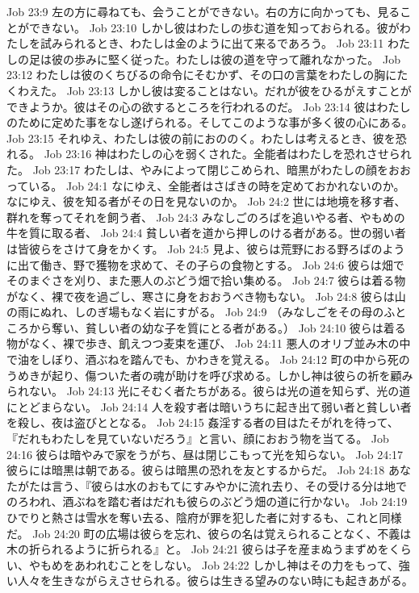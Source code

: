 Job 23:9  左の方に尋ねても、会うことができない。右の方に向かっても、見ることができない。
Job 23:10  しかし彼はわたしの歩む道を知っておられる。彼がわたしを試みられるとき、わたしは金のように出て来るであろう。
Job 23:11  わたしの足は彼の歩みに堅く従った。わたしは彼の道を守って離れなかった。
Job 23:12  わたしは彼のくちびるの命令にそむかず、その口の言葉をわたしの胸にたくわえた。
Job 23:13  しかし彼は変ることはない。だれが彼をひるがえすことができようか。彼はその心の欲するところを行われるのだ。
Job 23:14  彼はわたしのために定めた事をなし遂げられる。そしてこのような事が多く彼の心にある。
Job 23:15  それゆえ、わたしは彼の前におののく。わたしは考えるとき、彼を恐れる。
Job 23:16  神はわたしの心を弱くされた。全能者はわたしを恐れさせられた。
Job 23:17  わたしは、やみによって閉じこめられ、暗黒がわたしの顔をおおっている。
Job 24:1  なにゆえ、全能者はさばきの時を定めておかれないのか。なにゆえ、彼を知る者がその日を見ないのか。
Job 24:2  世には地境を移す者、群れを奪ってそれを飼う者、
Job 24:3  みなしごのろばを追いやる者、やもめの牛を質に取る者、
Job 24:4  貧しい者を道から押しのける者がある。世の弱い者は皆彼らをさけて身をかくす。
Job 24:5  見よ、彼らは荒野におる野ろばのように出て働き、野で獲物を求めて、その子らの食物とする。
Job 24:6  彼らは畑でそのまぐさを刈り、また悪人のぶどう畑で拾い集める。
Job 24:7  彼らは着る物がなく、裸で夜を過ごし、寒さに身をおおうべき物もない。
Job 24:8  彼らは山の雨にぬれ、しのぎ場もなく岩にすがる。
Job 24:9  （みなしごをその母のふところから奪い、貧しい者の幼な子を質にとる者がある。）
Job 24:10  彼らは着る物がなく、裸で歩き、飢えつつ麦束を運び、
Job 24:11  悪人のオリブ並み木の中で油をしぼり、酒ぶねを踏んでも、かわきを覚える。
Job 24:12  町の中から死のうめきが起り、傷ついた者の魂が助けを呼び求める。しかし神は彼らの祈を顧みられない。
Job 24:13  光にそむく者たちがある。彼らは光の道を知らず、光の道にとどまらない。
Job 24:14  人を殺す者は暗いうちに起き出て弱い者と貧しい者を殺し、夜は盗びととなる。
Job 24:15  姦淫する者の目はたそがれを待って、『だれもわたしを見ていないだろう』と言い、顔におおう物を当てる。
Job 24:16  彼らは暗やみで家をうがち、昼は閉じこもって光を知らない。
Job 24:17  彼らには暗黒は朝である。彼らは暗黒の恐れを友とするからだ。
Job 24:18  あなたがたは言う、『彼らは水のおもてにすみやかに流れ去り、その受ける分は地でのろわれ、酒ぶねを踏む者はだれも彼らのぶどう畑の道に行かない。
Job 24:19  ひでりと熱さは雪水を奪い去る、陰府が罪を犯した者に対するも、これと同様だ。
Job 24:20  町の広場は彼らを忘れ、彼らの名は覚えられることなく、不義は木の折られるように折られる』と。
Job 24:21  彼らは子を産まぬうまずめをくらい、やもめをあわれむことをしない。
Job 24:22  しかし神はその力をもって、強い人々を生きながらえさせられる。彼らは生きる望みのない時にも起きあがる。

